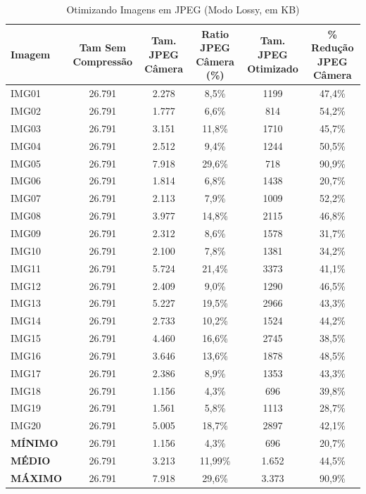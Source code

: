 \begin{table}[H]
    \centering
    \caption{Otimizando Imagens em JPEG (Modo Lossy, em KB)}
    \label{tab:6b}

    \footnotesize
    \begin{tabularx}{\textwidth}{X|C|C|C|C|C}
    \hline
        Imagem & Tam Sem Compressão & Tam. JPEG Câmera & Ratio JPEG Câmera (\%) & Tam. JPEG Otimizado & \% Redução JPEG Câmera \\ \hline
        IMG01 & 26.791 & 2.278 & 8,5\% & 1199 & 47,4\% \\ 
        IMG02 & 26.791 & 1.777 & 6,6\% & 814 & 54,2\% \\ 
        IMG03 & 26.791 & 3.151 & 11,8\% & 1710 & 45,7\% \\ 
        IMG04 & 26.791 & 2.512 & 9,4\% & 1244 & 50,5\% \\ 
        IMG05 & 26.791 & 7.918 & 29,6\% & 718 & 90,9\% \\ 
        IMG06 & 26.791 & 1.814 & 6,8\% & 1438 & 20,7\% \\ 
        IMG07 & 26.791 & 2.113 & 7,9\% & 1009 & 52,2\% \\ 
        IMG08 & 26.791 & 3.977 & 14,8\% & 2115 & 46,8\% \\ 
        IMG09 & 26.791 & 2.312 & 8,6\% & 1578 & 31,7\% \\ 
        IMG10 & 26.791 & 2.100 & 7,8\% & 1381 & 34,2\% \\ 
        IMG11 & 26.791 & 5.724 & 21,4\% & 3373 & 41,1\% \\ 
        IMG12 & 26.791 & 2.409 & 9,0\% & 1290 & 46,5\% \\ 
        IMG13 & 26.791 & 5.227 & 19,5\% & 2966 & 43,3\% \\ 
        IMG14 & 26.791 & 2.733 & 10,2\% & 1524 & 44,2\% \\ 
        IMG15 & 26.791 & 4.460 & 16,6\% & 2745 & 38,5\% \\ 
        IMG16 & 26.791 & 3.646 & 13,6\% & 1878 & 48,5\% \\ 
        IMG17 & 26.791 & 2.386 & 8,9\% & 1353 & 43,3\% \\ 
        IMG18 & 26.791 & 1.156 & 4,3\% & 696 & 39,8\% \\ 
        IMG19 & 26.791 & 1.561 & 5,8\% & 1113 & 28,7\% \\ 
        IMG20 & 26.791 & 5.005 & 18,7\% & 2897 & 42,1\% \\ \hline
        \textbf{MÍNIMO} & 26.791 & 1.156 & 4,3\% & 696 & 20,7\% \\ 
        \textbf{MÉDIO} & 26.791 & 3.213 & 11,99\% & 1.652 & 44,5\% \\ 
        \textbf{MÁXIMO} & 26.791 & 7.918 & 29,6\% & 3.373 & 90,9\% \\ 
    \end{tabularx}

    \autoriaPropria
\end{table}

